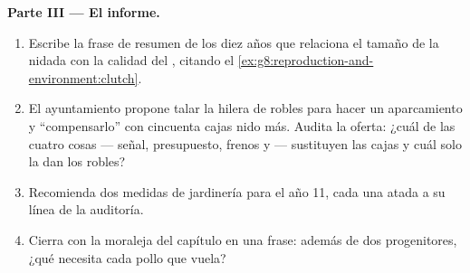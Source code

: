 \begin{problem}
\medskip\noindent\textbf{Parte III --- El informe.}
\begin{enumerate}[resume]
  \item Escribe la frase de resumen de los diez años que relaciona el
        tamaño de la nidada con la calidad del , citando el
        \cref{ex:g8:reproduction-and-environment:clutch}.
  \item El ayuntamiento propone talar la hilera de robles para hacer un
        aparcamiento y ``compensarlo'' con cincuenta cajas nido más.
        Audita la oferta: ¿cuál de las cuatro cosas --- señal,
        presupuesto, frenos y  --- sustituyen las cajas y cuál
        solo la dan los robles?
  \item Recomienda dos medidas de jardinería para el año 11, cada una
        atada a su línea de la auditoría.
  \item Cierra con la moraleja del capítulo en una frase: además de dos
        progenitores, ¿qué necesita cada pollo que vuela?
\end{enumerate}
\end{problem}
